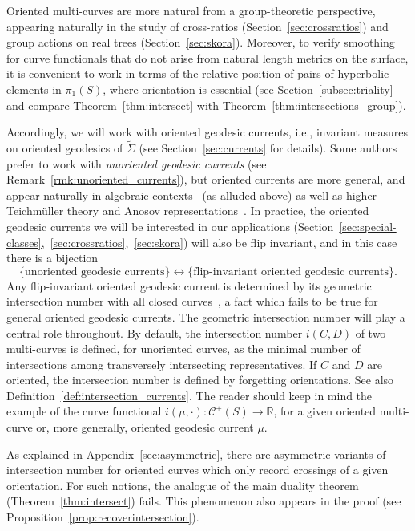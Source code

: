 \documentclass[11pt]{amsart}
\numberwithin{equation}{section}
\numberwithin{figure}{section}
\theoremstyle{definition}
\theoremstyle{plain}
\newcommand*{\wt}[1]{\widetilde{#1}}
\newcommand{\Curves}{\mathcal{C}}
\begin{document}
Oriented multi-curves are more natural from a group-theoretic perspective, appearing naturally in the study of cross-ratios (Section~\ref{sec:crossratios}) and group actions on real trees (Section~\ref{sec:skora}). 
Moreover, to verify smoothing for curve functionals that do not arise from natural length metrics on the surface, it is convenient to work in terms of the relative position of pairs of hyperbolic elements in $\pi_1(S)$, where orientation is essential (see Section~\ref{subsec:triality} and compare Theorem~\ref{thm:intersect} with Theorem~\ref{thm:intersections_group}).

Accordingly, we will
work with oriented geodesic currents, i.e., invariant measures on oriented geodesics of $\wt{\Sigma}$ (see
Section~\ref{sec:currents} for details). Some authors prefer to work with \emph{unoriented geodesic currents} (see Remark~\ref{rmk:unoriented_currents}), but oriented currents are more general, and appear naturally in algebraic contexts~\cite{Bonahon91:CurrentsGroups,EPS20:CountingCurves, CR25:Manhattan, CMGR26:GreenMetrics} (as alluded above) as well as higher Teichm\"uller theory and Anosov representations~\cite{BridgemanCanaryLabourieSambarino18:SimpleRoots}.
In practice, the oriented geodesic currents we will be interested in our applications (Section~\ref{sec:special-classes},~\ref{sec:crossratios},~\ref{sec:skora}) will also be flip invariant, and in this case there is a bijection~\cite[Exercise~3.1]{ES22:GeodesicCount}
\[
\{\text{unoriented geodesic currents}\}
\longleftrightarrow
\{\text{flip-invariant oriented geodesic currents}\}.
\]
 Any flip-invariant oriented geodesic current is determined by its geometric intersection number with all closed curves~\cite[Th\'eor\`eme~2]{Otal90:SpectreMarqueNegative}, a fact which fails to be true for general oriented geodesic currents.
The geometric intersection number will play a central role throughout.
By default, the intersection number $i(C,D)$ of two multi-curves is
defined, for unoriented curves, as the minimal number of intersections among transversely intersecting representatives. If $C$ and $D$ are oriented,
the
intersection number is defined by forgetting orientations. See also
Definition~\ref{def:intersection_currents}.  The reader should keep in mind the example of the curve functional $i(\mu, \cdot) \colon \Curves^+(S) \to \mathbb{R}$, for a given oriented multi-curve or, more generally, oriented geodesic current $\mu$.

As explained in Appendix~\ref{sec:asymmetric}, there are asymmetric
variants of intersection number for oriented curves which only record crossings of a given orientation. For such notions, the analogue of the main
duality theorem (Theorem~\ref{thm:intersect}) fails. This phenomenon
also appears in the proof (see Proposition~\ref{prop:recoverintersection}).
\end{document}
